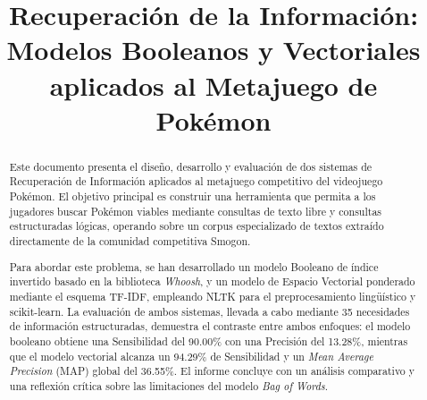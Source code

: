 \documentclass[conference,a4paper]{IEEEtran}
\begin{document}
\title{Recuperación de la Información: Modelos Booleanos y Vectoriales aplicados al Metajuego de Pokémon}

\author{
  
  \and
  
}

\maketitle

\begin{abstract}
  Este documento presenta el diseño, desarrollo y evaluación de dos sistemas de Recuperación de Información aplicados al metajuego competitivo del videojuego Pokémon. El objetivo principal es construir una herramienta que permita a los jugadores buscar Pokémon viables mediante consultas de texto libre y consultas estructuradas lógicas, operando sobre un corpus especializado de textos extraído directamente de la comunidad competitiva Smogon. 
  
  Para abordar este problema, se han desarrollado un modelo Booleano de índice invertido basado en la biblioteca \emph{Whoosh}, y un modelo de Espacio Vectorial ponderado mediante el esquema TF-IDF, empleando NLTK para el preprocesamiento lingüístico y scikit-learn. La evaluación de ambos sistemas, llevada a cabo mediante 35 necesidades de información estructuradas, demuestra el contraste entre ambos enfoques: el modelo booleano obtiene una Sensibilidad del 90.00\% con una Precisión del 13.28\%, mientras que el modelo vectorial alcanza un 94.29\% de Sensibilidad y un \emph{Mean Average Precision} (MAP) global del 36.55\%. El informe concluye con un análisis comparativo y una reflexión crítica sobre las limitaciones del modelo \emph{Bag of Words}.
\end{abstract}
\end{document}
